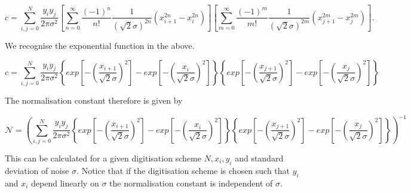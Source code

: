 \documentclass[apj]{emulateapj}
\begin{document}
\begin{equation}
c = \sum_{i,j=0}^N \frac{y_i y_j}{2\pi\sigma^2} \left[ \sum_{n = 0}^\infty \frac{(-1)^n}{n!} \frac{1}{(\sqrt{2}\sigma)^{2n}}  ( x_{i+1}^{2n} - x_{i}^{2n} ) \right] \left[ \sum_{m = 0}^\infty \frac{(-1)^m}{m!} \frac{1}{(\sqrt{2}\sigma)^{2m}} ( x_{j+1}^{2m} - x_{j}^{2m} ) \right].
\end{equation}

We recognise the exponential function in the above.

\begin{equation}
c = \sum_{i,j=0}^N \frac{y_i y_j}{2\pi\sigma^2} \left\{ exp \left[ - \left(\frac{x_{i+1}}{\sqrt{2}\sigma} \right)^2 \right] - exp \left[ - \left(\frac{x_{i}}{\sqrt{2}\sigma} \right)^2 \right] \right\} \left\{ exp \left[ - \left(\frac{x_{j+1}}{\sqrt{2}\sigma} \right)^2 \right] - exp \left[ - \left(\frac{x_{j}}{\sqrt{2}\sigma} \right)^2 \right] \right\}
\end{equation}

The normalisation constant therefore is given by

\begin{equation}
\mathcal{N} = \left( \sum_{i,j=0}^N \frac{y_i y_j}{2\pi\sigma^2} \left\{ exp \left[ - \left(\frac{x_{i+1}}{\sqrt{2}\sigma} \right)^2 \right] - exp \left[ - \left(\frac{x_{i}}{\sqrt{2}\sigma} \right)^2 \right] \right\} \left\{ exp \left[ - \left(\frac{x_{j+1}}{\sqrt{2}\sigma} \right)^2 \right] - exp \left[ - \left(\frac{x_{j}}{\sqrt{2}\sigma} \right)^2 \right] \right\} \right)^{-1}
\end{equation}

This can be calculated for a given digitisation scheme $N, x_i, y_i$ and standard deviation of noise $\sigma$. Notice that if the digitisation scheme is chosen such that $y_i$ and $x_i$ depend linearly on $\sigma$ the normalisation constant is independent of $\sigma$.

\newpage


\end{document}
